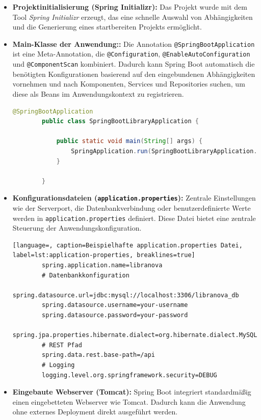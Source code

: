 \begin{itemize}
	\item \textbf{Projektinitialisierung (Spring Initializr):} Das Projekt wurde mit dem Tool \textit{Spring Initializr} erzeugt, das eine schnelle Auswahl von Abhängigkeiten und die Generierung eines startbereiten Projekts ermöglicht.
	
	\item \textbf{Main-Klasse der Anwendung::} Die Annotation \texttt{\mbox{@SpringBootApplication}}
	 ist eine Meta-Annotation, die \texttt{@Configuration}, \texttt{@EnableAutoConfiguration} und \texttt{@ComponentScan} kombiniert. Dadurch kann Spring Boot automatisch die benötigten Konfigurationen basierend auf den eingebundenen Abhängigkeiten vornehmen und nach Komponenten, Services und Repositories suchen, um diese als Beans im Anwendungskontext zu registrieren.
	\begin{lstlisting}[language=Java, caption=Einstiegspunkt der Spring Boot Anwendung, label=lst:springboot-main, breaklines=true]
		@SpringBootApplication
		public class SpringBootLibraryApplication {
			
			public static void main(String[] args) {
				SpringApplication.run(SpringBootLibraryApplication.class, args);
			}
			
		}
	\end{lstlisting}
	
	\item \textbf{Konfigurationsdateien (\texttt{application.properties}):} Zentrale Einstellungen wie der Serverport, die Datenbankverbindung oder benutzerdefinierte Werte werden in \texttt{application.properties} definiert. Diese Datei bietet eine zentrale Steuerung der Anwendungskonfiguration.
	\begin{lstlisting}[language=, caption=Beispielhafte application.properties Datei, label=lst:application-properties, breaklines=true]
		spring.application.name=libranova
		# Datenbankkonfiguration
		spring.datasource.url=jdbc:mysql://localhost:3306/libranova_db
		spring.datasource.username=your-username
		spring.datasource.password=your-password
		spring.jpa.properties.hibernate.dialect=org.hibernate.dialect.MySQLDialect
		# REST Pfad
		spring.data.rest.base-path=/api
		# Logging 
		logging.level.org.springframework.security=DEBUG
	\end{lstlisting}
	
	
	\item \textbf{Eingebaute Webserver (Tomcat):} Spring Boot integriert standardmäßig einen eingebetteten Webserver wie Tomcat. Dadurch kann die Anwendung ohne externes Deployment direkt ausgeführt werden.
\end{itemize}

